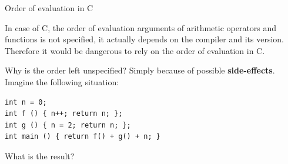 %
\begin{frame}[fragile]{Order of evaluation in C}

  In case of C, the order of evaluation arguments of arithmetic
  operators and functions is not specified, it actually depends on the
  compiler and its version. Therefore it would be dangerous to rely on
  the order of evaluation in C.

  \bigskip

  Why is the order left unspecified? Simply because of possible
  \textbf{side-effects}. Imagine the following situation:
{\footnotesize
\begin{verbatim}
int n = 0;
int f () { n++; return n; };
int g () { n = 2; return n; };
int main () { return f() + g() + n; }
\end{verbatim}
}
What is the result?

\end{frame}
